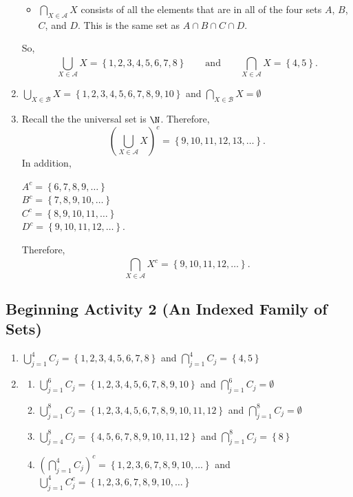 \documentclass[11pt]{article}
\begin{document}
\begin{enumerate}
\begin{itemize}
\item $\bigcap\limits_{X \in \mathscr{A}}^{}X$ consists of all the elements that are in all of the four sets $A$, $B$, $C$, and $D$.  This is the same set as  $A \cap B \cap C \cap D$.
\end{itemize}  
So,
\[
\bigcup_{X \in \mathscr{A}}^{}X = \left\{1, 2, 3, 4, 5, 6, 7, 8 \right\} \qquad \text{and} \qquad
\bigcap_{X \in \mathscr{A}}^{}X = \left\{4, 5 \right\}.
\]

\item $\bigcup\limits_{X \in \mathscr{B}}^{}X = \left\{1, 2, 3, 4, 5, 6, 7, 8, 9, 10 \right\}$ \qquad and \qquad $\bigcap_{X \in \mathscr{B}}^{}X = \emptyset$

\item Recall the the universal set is $\N$.  Therefore,
\[
\left( \bigcup_{X \in \mathscr{A}}^{}X \right)^c = \left\{9, 10, 11, 12, 13, \ldots \right\}.
\]
In addition,
\begin{multicols}{2}
$A^c = \left\{6, 7, 8, 9, \ldots \right\}$ \\
$B^c = \left\{7, 8, 9, 10, \ldots \right\}$ \\
$C^c = \left\{8, 9, 10, 11, \ldots \right\}$ \\
$D^c = \left\{9, 10, 11, 12, \ldots \right\}$. 
\end{multicols}
Therefore,
\[
\bigcap_{X \in \mathscr{A}}^{}X^c = \left\{9, 10, 11, 12, \ldots \right\}.
\]
\end{enumerate}
\hbreak



\subsection*{Beginning Activity 2 (An Indexed Family of Sets)}
\begin{enumerate}
\item $\bigcup\limits_{j=1}^{4}C_j = \left\{ 1, 2, 3, 4, 5, 6, 7, 8 \right\}$ \qquad and  \qquad
$\bigcap\limits_{j=1}^{4}C_j = \left\{ 4, 5 \right\}$

\item \begin{enumerate}
\item $\bigcup\limits_{j=1}^{6}C_j = \left\{ 1, 2, 3, 4, 5, 6, 7, 8, 9, 10 \right\}$ and  
$\bigcap\limits_{j=1}^{6}C_j = \emptyset$

\item $\bigcup\limits_{j=1}^{8}C_j = \left\{ 1, 2, 3, 4, 5, 6, 7, 8, 9, 10, 11, 12 \right\}$ and  $\bigcap\limits_{j=1}^{8}C_j = \emptyset$

\item $\bigcup\limits_{j=4}^{8}C_j = \left\{ 4, 5, 6, 7, 8, 9, 10, 11, 12 \right\}$ and  
$\bigcap\limits_{j=1}^{8}C_j = \left\{ 8 \right\}$


\item $( \bigcap\limits_{j=1}^{4}C_j )^c = \left\{1, 2, 3, 6, 7, 8, 9, 10, \ldots \right\}$ and \\
$\bigcup\limits_{j=1}^{4}C_j^c = \left\{1, 2, 3, 6, 7, 8, 9, 10, \ldots \right\}$

\end{enumerate}
\end{enumerate}
\hbreak
\end{document}
